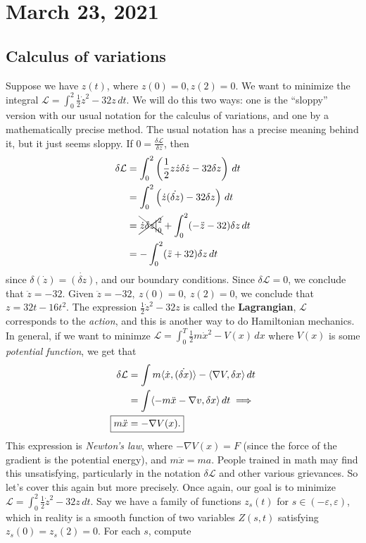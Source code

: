 \section{March 23, 2021} 
\subsection{Calculus of variations}
Suppose we have $z(t)$, where $z(0)=0,z(2)=0$. We want to minimize the integral $\mathcal{L} =\int_0^2 \frac{1}{2}\dot z^2-32z \, dt$. We will do this two ways: one is the ``sloppy'' version with our usual notation for the calculus of variations, and one by a mathematically precise method. The usual notation has a precise meaning behind it, but it just seems sloppy. If $0= \frac{\delta \mathcal{L} }{\delta z}$, then 
\begin{align*}
    \delta \mathcal{L} &= \int_{0}^{2} \left( \frac{1}{2}z \dot z \delta  \dot z-32 \delta z \right)  \, dt\\
                       &=\int_{0}^{2} \left( \dot z \dot{\left( \delta z \right) } -32 \delta z \right)  \, dt\\
                       &=\xcancel{  \dot z \delta z \big|_0^2}+\int_{0}^{2} (-\ddot z-32)\delta z \, dt\\
                       &= -\int_{0}^{2} (\ddot z +32)\delta z  \, dt
\end{align*}since $\delta (\dot z)=\dot{(\delta z)} $, and our boundary conditions. Since $\delta \mathcal{L} =0$, we conclude that $\ddot z=-32$. Given $\ddot z=-32,\ z(0)=0,\ z(2)=0$, we conclude that $z=32t-16 t^2$. The expression $\frac{1}{2}\dot z^2-32z$ is called the \textbf{Lagrangian}, $\mathcal{L} $ corresponds to the \emph{action}, and this is another way to do Hamiltonian mechanics. In general, if we want to minimze $\mathcal{L} =\int_{0}^{T} \frac{1}{2}m\dot x ^2-V(x) \, dx$ where $V(x)$ is some \emph{potential function}, we get that 
\begin{align*}
    \delta \mathcal{L} &=\int m\langle \dot x,\dot{(\delta x)}  \rangle -\langle \nabla V,\delta x \rangle  \, dt\\
                       &=\int \langle -m \ddot x- \nabla v, \delta x \rangle  \, dt \implies \\
    \Aboxed{ m\ddot x&=-\nabla V(x).}
\end{align*}This expression is \emph{Newton's law}, where $-\nabla V(x)=F$ (since the force of the gradient is the potential energy), and $m\ddot x=ma$. People trained in math may find this unsatisfying, particularly in the notation $\delta \mathcal{L} $ and other various grievances. So let's cover this again but more precisely. Once again, our goal is to minimize $\mathcal{L} =\int_{0}^{2} \frac{1}{2}\dot z^2-32z \, dt$. Say we have a family of functions $z_s(t)$ for $s \in \left( -\varepsilon ,\varepsilon  \right) $, which in reality is a smooth function of two variables $Z(s,t)$ satisfying $z_s(0)=z_s(2)=0$. For each $s$, compute 
